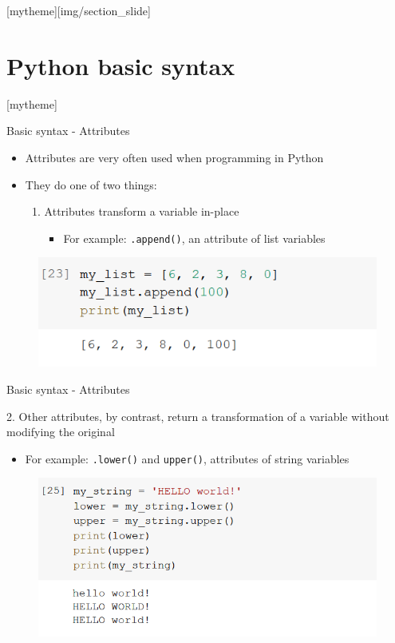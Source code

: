 \documentclass[aspectratio=169]{beamer}
\newcommand{\sectionpic}[2]{
	\setbeamertemplate{section page}[mytheme][#2]
	\section{#1}
	\setbeamertemplate{section page}[mytheme]
}
\begin{document}
\sectionpic{Python basic syntax}{img/section_slide}


\begin{frame}{Basic syntax - Attributes}

	\begin{itemize}
		\item Attributes are very often used when programming in Python
		\item They do one of two things:
			\begin{enumerate}
				\item Attributes transform a variable in-place
				\begin{itemize}
					\item For example: \texttt{.append()}, an attribute of list variables
				\end{itemize}
			\end{enumerate}
	\end{itemize}

	\begin{figure}
		\centering
		\includegraphics[width=0.6\linewidth]{img/attributes_append.png}
	\end{figure}

\end{frame}

\begin{frame}{Basic syntax - Attributes}

	2. Other attributes, by contrast, return a transformation of a variable without modifying the original
		
	\begin{itemize}
		\item For example: \texttt{.lower()} and \texttt{upper()}, attributes of string variables
	\end{itemize}

	\begin{figure}
		\centering
		\includegraphics[width=0.6\linewidth]{img/string_lower_upper.png}
	\end{figure}

\end{frame}
\end{document}
